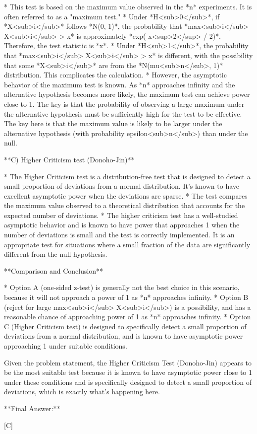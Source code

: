 *   This test is based on the maximum value observed in the *n* experiments.  It is often referred to as a "maximum test."
*   Under *H<sub>0</sub>*, if *X<sub>i</sub>* follows *N(0, 1)*, the probability that *max<sub>i</sub> X<sub>i</sub> > x* is approximately *exp(-x<sup>2</sup> / 2)*.  Therefore, the test statistic is *x*.
*   Under *H<sub>1</sub>*, the probability that *max<sub>i</sub> X<sub>i</sub> > x* is different, with the possibility that some *X<sub>i</sub>* are from the *N(mu<sub>n</sub>, 1)* distribution.  This complicates the calculation.
*   However, the asymptotic behavior of the maximum test is known. As *n* approaches infinity and the alternative hypothesis becomes more likely, the maximum test can achieve power close to 1.  The key is that the probability of observing a large maximum under the alternative hypothesis must be sufficiently high for the test to be effective. The key here is that the maximum value is likely to be larger under the alternative hypothesis (with probability epsilon<sub>n</sub>) than under the null.

**C) Higher Criticism test (Donoho-Jin)**

*   The Higher Criticism test is a distribution-free test that is designed to detect a small proportion of deviations from a normal distribution. It's known to have excellent asymptotic power when the deviations are sparse.
*   The test compares the maximum value observed to a theoretical distribution that accounts for the expected number of deviations.
*   The higher criticism test has a well-studied asymptotic behavior and is known to have power that approaches 1 when the number of deviations is small and the test is correctly implemented.  It is an appropriate test for situations where a small fraction of the data are significantly different from the null hypothesis.

**Comparison and Conclusion**

*   Option A (one-sided z-test) is generally not the best choice in this scenario, because it will not approach a power of 1 as *n* approaches infinity.
*   Option B (reject for large max<sub>i</sub> X<sub>i</sub>) is a possibility, and has a reasonable chance of approaching power of 1 as *n* approaches infinity.
*   Option C (Higher Criticism test) is designed to specifically detect a small proportion of deviations from a normal distribution, and is known to have asymptotic power approaching 1 under suitable conditions.

Given the problem statement, the Higher Criticism Test (Donoho-Jin) appears to be the most suitable test because it is known to have asymptotic power close to 1 under these conditions and is specifically designed to detect a small proportion of deviations, which is exactly what’s happening here.

**Final Answer:**

[C]
